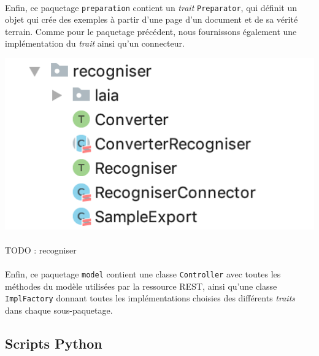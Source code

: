 \paragraph{}
Enfin, ce paquetage \texttt{preparation} contient un \textit{trait} \texttt{Preparator}, qui définit un objet qui crée des exemples à partir d'une page d'un document et de sa vérité terrain. Comme pour le paquetage précédent, nous fournissons également une implémentation du \textit{trait} ainsi qu'un connecteur.

\begin{mdframed}[frametitle={Figure 1 : Paquetage \texttt{recogniser}}, innerbottommargin=10]
\begin{center}
\includegraphics[scale=0.7]{assets/recogniser.png}
\end{center}
\end{mdframed}

\paragraph{}
TODO : recogniser

\paragraph{}
Enfin, ce paquetage \texttt{model} contient une classe \texttt{Controller} avec toutes les méthodes du modèle utilisées par la ressource REST, ainsi qu'une classe \texttt{ImplFactory} donnant toutes les implémentations choisies des différents \textit{traits} dans chaque sous-paquetage.

\subsection{Scripts Python}

